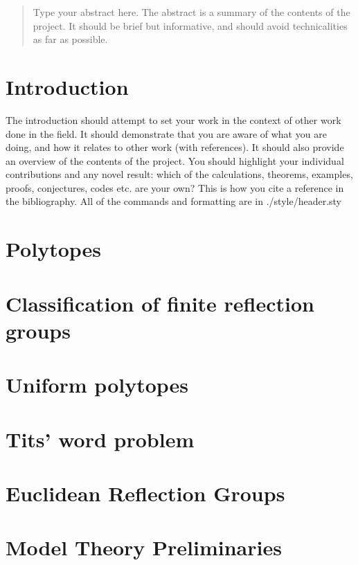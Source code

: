 \documentclass[a4paper,11pt, titlepage]{article}
\begin{document}
\begin{titlepage}

\end{titlepage}

\begin{abstract}
Type your abstract here. The abstract is a summary of the contents of the project. It should be brief but informative, and
should avoid technicalities as far as possible.
\end{abstract}

\tableofcontents
\clearpage

\section{Introduction}
The introduction should attempt to set your work in the context of other work done in the field. It
should demonstrate that you are aware of what you are doing, and how it relates to other work
(with references). It should also provide an overview of the contents of the project. You should
highlight your individual contributions and any novel result: which of the calculations, theorems,
examples, proofs, conjectures, codes etc. are your own? This is how you cite a reference in the bibliography\cite{Humphreys1990}. All of the commands and formatting are in ./style/header.sty

\section{Polytopes}


\section{Classification of finite reflection groups}


\section{Uniform polytopes}


\section{Tits' word problem}


\section{Euclidean Reflection Groups}


\appendix
\section{Model Theory Preliminaries}



\end{document}
